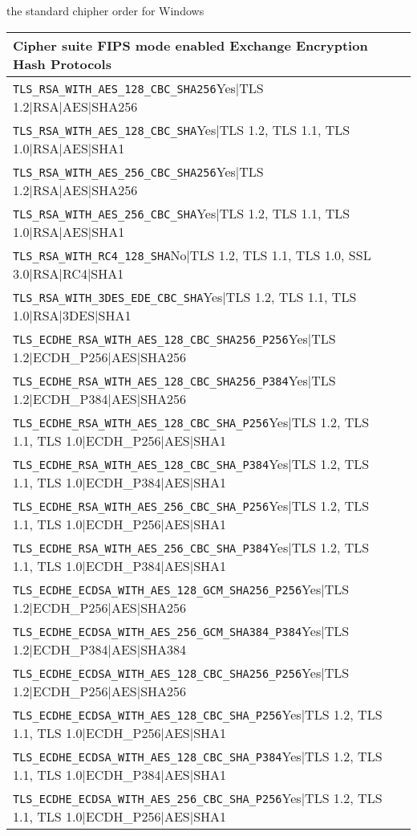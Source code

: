 the standard chipher order for Windows 
\begin{table}[h]
  \centering
  \small
  \begin{tabular}{ll}
    \toprule
    Cipher suite	FIPS mode enabled	Exchange	Encryption	Hash	Protocols\\
    \midrule
\verb |TLS_RSA_WITH_AES_128_CBC_SHA256|Yes|TLS 1.2|RSA|AES|SHA256\\
\verb |TLS_RSA_WITH_AES_128_CBC_SHA|Yes|TLS 1.2, TLS 1.1, TLS 1.0|RSA|AES|SHA1\\
\verb |TLS_RSA_WITH_AES_256_CBC_SHA256|Yes|TLS 1.2|RSA|AES|SHA256\\
\verb |TLS_RSA_WITH_AES_256_CBC_SHA|Yes|TLS 1.2, TLS 1.1, TLS 1.0|RSA|AES|SHA1\\
\verb |TLS_RSA_WITH_RC4_128_SHA|No|TLS 1.2, TLS 1.1, TLS 1.0, SSL 3.0|RSA|RC4|SHA1\\
\verb |TLS_RSA_WITH_3DES_EDE_CBC_SHA|Yes|TLS 1.2, TLS 1.1, TLS 1.0|RSA|3DES|SHA1\\
\verb |TLS_ECDHE_RSA_WITH_AES_128_CBC_SHA256_P256|Yes|TLS 1.2|ECDH_P256|AES|SHA256\\
\verb |TLS_ECDHE_RSA_WITH_AES_128_CBC_SHA256_P384|Yes|TLS 1.2|ECDH_P384|AES|SHA256\\
\verb |TLS_ECDHE_RSA_WITH_AES_128_CBC_SHA_P256|Yes|TLS 1.2, TLS 1.1, TLS 1.0|ECDH_P256|AES|SHA1\\
\verb |TLS_ECDHE_RSA_WITH_AES_128_CBC_SHA_P384|Yes|TLS 1.2, TLS 1.1, TLS 1.0|ECDH_P384|AES|SHA1\\
\verb |TLS_ECDHE_RSA_WITH_AES_256_CBC_SHA_P256|Yes|TLS 1.2, TLS 1.1, TLS 1.0|ECDH_P256|AES|SHA1\\
\verb |TLS_ECDHE_RSA_WITH_AES_256_CBC_SHA_P384|Yes|TLS 1.2, TLS 1.1, TLS 1.0|ECDH_P384|AES|SHA1\\
\verb |TLS_ECDHE_ECDSA_WITH_AES_128_GCM_SHA256_P256|Yes|TLS 1.2|ECDH_P256|AES|SHA256\\
\verb |TLS_ECDHE_ECDSA_WITH_AES_256_GCM_SHA384_P384|Yes|TLS 1.2|ECDH_P384|AES|SHA384\\
\verb |TLS_ECDHE_ECDSA_WITH_AES_128_CBC_SHA256_P256|Yes|TLS 1.2|ECDH_P256|AES|SHA256\\
\verb |TLS_ECDHE_ECDSA_WITH_AES_128_CBC_SHA_P256|Yes|TLS 1.2, TLS 1.1, TLS 1.0|ECDH_P256|AES|SHA1\\
\verb |TLS_ECDHE_ECDSA_WITH_AES_128_CBC_SHA_P384|Yes|TLS 1.2, TLS 1.1, TLS 1.0|ECDH_P384|AES|SHA1\\
\verb |TLS_ECDHE_ECDSA_WITH_AES_256_CBC_SHA_P256|Yes|TLS 1.2, TLS 1.1, TLS 1.0|ECDH_P256|AES|SHA1\\

\end{tabular}
\end{table}
